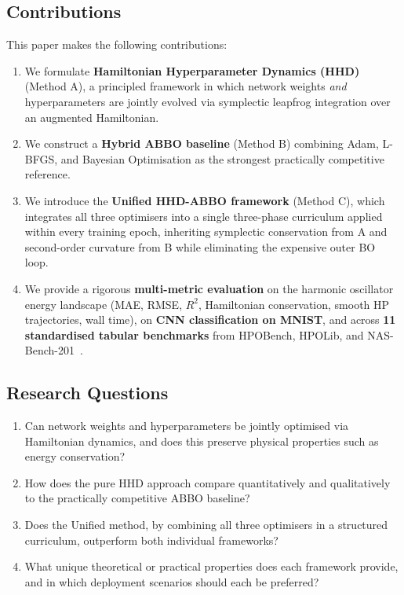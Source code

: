 \documentclass[11pt]{article}
\begin{document}
\subsection{Contributions}

This paper makes the following contributions:

\begin{enumerate}[leftmargin=*, label=\arabic*.]
\item We formulate \textbf{Hamiltonian Hyperparameter Dynamics (HHD)}
      (Method A), a principled framework in which network weights
      \emph{and} hyperparameters are jointly evolved via symplectic
      leapfrog integration over an augmented Hamiltonian.

\item We construct a \textbf{Hybrid ABBO baseline} (Method B) combining
      Adam, L-BFGS, and Bayesian Optimisation as the strongest
      practically competitive reference.

\item We introduce the \textbf{Unified HHD-ABBO framework}
      (Method C), which integrates all three optimisers into a
      single three-phase curriculum applied within every training
      epoch, inheriting symplectic conservation from A and
      second-order curvature from B while eliminating the expensive
      outer BO loop.

\item We provide a rigorous \textbf{multi-metric evaluation} on the
      harmonic oscillator energy landscape (MAE, RMSE, $R^2$,
      Hamiltonian conservation, smooth HP trajectories, wall time),
      on \textbf{CNN classification on MNIST}, and across
      \textbf{11 standardised tabular benchmarks} from HPOBench,
      HPOLib, and NAS-Bench-201~\cite{eggensperger2021,dong2020nasbench201}.
\end{enumerate}

\subsection{Research Questions}

\begin{enumerate}[leftmargin=*, label=\textbf{RQ\arabic*.}]
\item Can network weights and hyperparameters be jointly optimised via
      Hamiltonian dynamics, and does this preserve physical properties
      such as energy conservation?
\item How does the pure HHD approach compare quantitatively and
      qualitatively to the practically competitive ABBO baseline?
\item Does the Unified method, by combining all three optimisers in a
      structured curriculum, outperform both individual frameworks?
\item What unique theoretical or practical properties does each
      framework provide, and in which deployment scenarios should
      each be preferred?
\end{enumerate}
\end{document}
